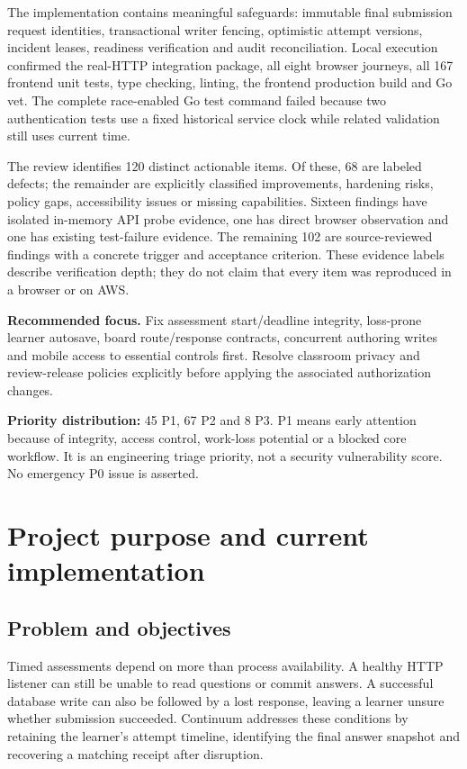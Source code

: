 \documentclass[11pt,a4paper]{article}
\begin{document}
The implementation contains meaningful safeguards: immutable final submission request identities, transactional writer fencing, optimistic attempt versions, incident leases, readiness verification and audit reconciliation. Local execution confirmed the real-HTTP integration package, all eight browser journeys, all 167 frontend unit tests, type checking, linting, the frontend production build and Go vet. The complete race-enabled Go test command failed because two authentication tests use a fixed historical service clock while related validation still uses current time.

The review identifies 120 distinct actionable items. Of these, 68 are labeled defects; the remainder are explicitly classified improvements, hardening risks, policy gaps, accessibility issues or missing capabilities. Sixteen findings have isolated in-memory API probe evidence, one has direct browser observation and one has existing test-failure evidence. The remaining 102 are source-reviewed findings with a concrete trigger and acceptance criterion. These evidence labels describe verification depth; they do not claim that every item was reproduced in a browser or on AWS.

\begin{note}\textbf{Recommended focus.} Fix assessment start/deadline integrity, loss-prone learner autosave, board route/response contracts, concurrent authoring writes and mobile access to essential controls first. Resolve classroom privacy and review-release policies explicitly before applying the associated authorization changes.\end{note}
\textbf{Priority distribution:} 45 P1, 67 P2 and 8 P3. P1 means early attention because of integrity, access control, work-loss potential or a blocked core workflow. It is an engineering triage priority, not a security vulnerability score. No emergency P0 issue is asserted.
\clearpage\tableofcontents\clearpage{}

\section{Project purpose and current implementation}
\subsection{Problem and objectives}
Timed assessments depend on more than process availability. A healthy HTTP listener can still be unable to read questions or commit answers. A successful database write can also be followed by a lost response, leaving a learner unsure whether submission succeeded. Continuum addresses these conditions by retaining the learner's attempt timeline, identifying the final answer snapshot and recovering a matching receipt after disruption.
\end{document}
